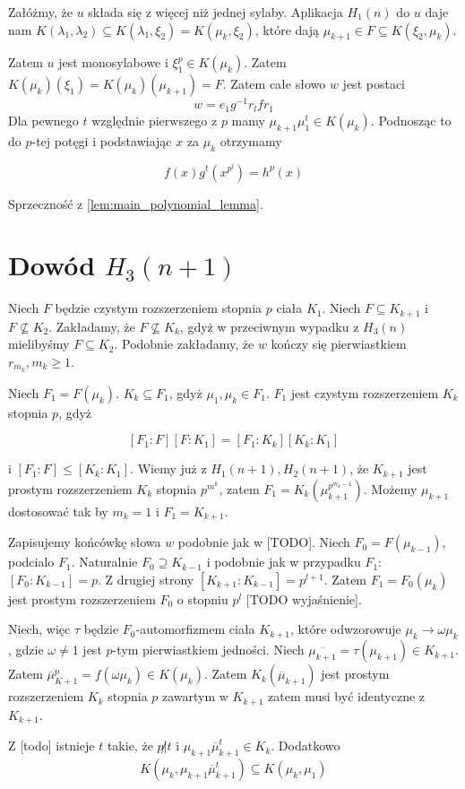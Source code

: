 Załóżmy, że $u$ składa się z więcej niż jednej sylaby. Aplikacja $H_1(n)$ do $u$
daje nam
$K \left( \lambda_1, \lambda_2 \right) \subseteq K \left( \lambda_1, \xi_2
\right) = K \left( \mu_k, \xi_2 \right)$, które dają $\mu_{k+1} \in F \subseteq
K \left( \xi_2, \mu_k \right)$.

Zatem $u$ jest monosylabowe i $\xi_1^p \in K \left( \mu_k\right)$. Zatem
$K \left( \mu_k \right) \left(\xi_1 \right) = K \left(\mu_k \right)
\left(\mu_{k+1} \right) = F$. Zatem całe słowo $w$ jest postaci
\[w = e_1 g^{-1}r_lfr_1\]
Dla pewnego $t$ względnie pierwszego z $p$ mamy $\mu_{k+1} \mu_1^t \in K \left(
\mu_k \right)$.  Podnosząc to do $p$-tej potęgi i podstawiając $x$ za $\mu_k$
otrzymamy

\[f(x)g^t \left( x^{p^l} \right) = h^p(x)\]

Sprzeczność z \ref{lem:main_polynomial_lemma}.


\section{Dowód $H_3(n+1)$}
Niech $F$ będzie czystym rozszerzeniem stopnia $p$ ciała $K_1$. Niech $F
\subseteq K_{k+1}$ i $F \not \subseteq K_2$. Zakładamy, że $F \not \subseteq
K_k$, gdyż w przeciwnym wypadku z $H_3(n)$ mielibyśmy $F \subseteq K_2$.
Podobnie zakładamy, że $w$ kończy się pierwiastkiem $r_{m_k}, m_k \geq 1$.

Niech $F_1 = F \left( \mu_k \right)$. $K_k \subseteq F_1$, gdyż $\mu_1, \mu_k
\in F_1$. $F_1$ jest czystym rozszerzeniem $K_k$ stopnia $p$, gdyż

\[
\left[F_1:F\right]\left[F:K_1 \right] =
\left[F_1:K_k\right]\left[K_k:K_1\right]
\]

i $\left[F_1:F\right] \leq \left[K_k:K_1\right]$. Wiemy już z $H_1(n+1),
H_2(n+1)$, że $K_{k+1}$ jest prostym rozszerzeniem $K_k$ stopnia $p^{m^k}$,
zatem $F_1 = K_k \left(\mu_{k+1}^{p^{m_k -1}} \right)$. Możemy $\mu_{k+1}$
dostosować tak by $m_k = 1$ i $F_1 = K_{k+1}$.

Zapisujemy końcówkę słowa $w$ podobnie jak w [TODO]. Niech $F_0 = F \left(
\mu_{k-1} \right)$, podcialo $F_1$. Naturalnie $F_0 \supseteq K_{k-1}$ i
podobnie jak w przypadku $F_1$: $\left[F_0:K_{k-1} \right] = p$. Z drugiej
strony $\left[ K_{k+1} : K_{k-1} \right] = p^{l+1}$.
Zatem $F_1 = F_0 \left(\mu_k \right)$ jest prostym rozszerzeniem $F_0$ o stopniu
$p^l$ [TODO wyjaśnienie].

Niech, więc $\tau$ będzie $F_0$-automorfizmem ciała $K_{k+1}$, które odwzorowuje
$\mu_k \rightarrow \omega \mu_k$, gdzie $\omega \neq 1$ jest $p$-tym
pierwiastkiem jedności. Niech $\overline{\mu_{k+1}} = \tau \left( \mu_{k+1}
\right) \in K_{k+1}$. Zatem $\overline{\mu}_{K+1}^p = f \left( \omega \mu_k
\right) \in K \left( \mu_k \right)$.
Zatem $K_k \left(\overline{\mu}_{k+1} \right)$ jest prostym rozszerzeniem $K_k$
stopnia $p$ zawartym w $K_{k+1}$ zatem musi być identyczne z $K_{k+1}$.

Z [todo] istnieje $t$ takie, że $p \not | t$ i
$\mu_{k+1} \overline{\mu}_{k+1}^t \in K_k$. Dodatkowo
\[ K \left( \mu_k, \mu_{k+1} \overline{\mu}_{k+1}^t \right)
  \subseteq
  K \left( \mu_k, \mu_1 \right)
\]

